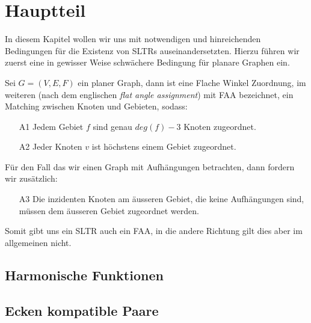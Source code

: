 \chapter{Hauptteil}

In diesem Kapitel wollen wir uns mit notwendigen und hinreichenden Bedingungen für die Existenz von SLTRs auseinandersetzten. Hierzu führen wir zuerst eine in gewisser Weise schwächere Bedingung für planare Graphen ein.

\begin{definition}[FAA]
Sei $G=(V,E,F)$ ein planer Graph, dann ist eine Flache Winkel Zuordnung, im weiteren (nach dem englischen \textit{flat angle assignment}) mit FAA bezeichnet, ein Matching zwischen Knoten und Gebieten, sodass:
\begin{itemize}
\item [A1] Jedem Gebiet $f$ sind genau $deg(f)-3$ Knoten zugeordnet.
\item [A2] Jeder Knoten $v$ ist höchstens einem Gebiet zugeordnet.
\end{itemize}
Für den Fall das wir einen Graph mit Aufhängungen betrachten, dann fordern wir zusätzlich:
\begin{itemize}
\item [A3] Die inzidenten Knoten am äusseren Gebiet, die keine Aufhängungen sind, müssen dem äusseren Gebiet zugeordnet werden.
\end{itemize}
\end{definition}

Somit gibt uns ein SLTR auch ein FAA, in die andere Richtung gilt dies aber im allgemeinen nicht.


\section{Harmonische Funktionen}


\section{Ecken kompatible Paare}